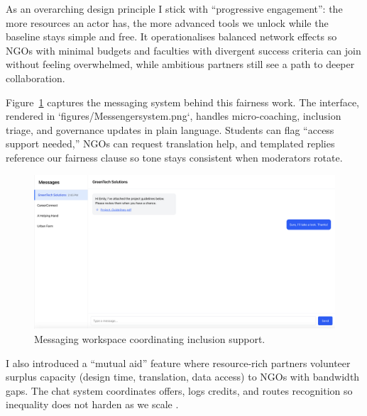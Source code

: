As an overarching design principle I stick with ``progressive engagement'': the more resources an actor has, the more advanced tools we unlock while the baseline stays simple and free. It operationalises balanced network effects so NGOs with minimal budgets and faculties with divergent success criteria can join without feeling overwhelmed, while ambitious partners still see a path to deeper collaboration.

Figure~\ref{fig:chat-system} captures the messaging system behind this fairness work. The interface, rendered in `figures/Messengersystem.png`, handles micro-coaching, inclusion triage, and governance updates in plain language. Students can flag ``access support needed,'' NGOs can request translation help, and templated replies reference our fairness clause so tone stays consistent when moderators rotate.

\begin{figure}[H]
  \centering
  \includegraphics[width=0.85\linewidth]{figures/Messengersystem.png}
  \caption{Messaging workspace coordinating inclusion support.}
  \label{fig:chat-system}
\end{figure}

I also introduced a ``mutual aid'' feature where resource-rich partners volunteer surplus capacity (design time, translation, data access) to NGOs with bandwidth gaps. The chat system coordinates offers, logs credits, and routes recognition so inequality does not harden as we scale \citep{Lecture09}.
